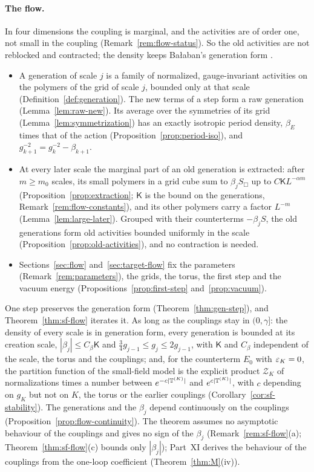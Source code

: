 \paragraph{The flow.} In four dimensions the coupling is marginal, and the activities are of order one, not small in the coupling (Remark~\ref{rem:flow-status}). So the old activities are not reblocked and contracted; the density keeps Ba\l aban's generation form \cite[(0.22)--(0.30)]{BalYM4I}.
\begin{itemize}
\item A generation of scale $j$ is a family of normalized, gauge-invariant activities on the polymers of the grid of scale $j$, bounded only at that scale (Definition~\ref{def:generation}). The new terms of a step form a raw generation (Lemma~\ref{lem:raw-new}). Its average over the symmetries of its grid (Lemma~\ref{lem:symmetrization}) has an exactly isotropic period density, $\beta_E$ times that of the action (Proposition~\ref{prop:period-iso}), and $g_{k+1}^{-2}=g_k^{-2}-\beta_{k+1}$.
\item At every later scale the marginal part of an old generation is extracted: after $m\ge m_0$ scales, its small polymers in a grid cube sum to $\beta_jS_\Box$ up to $C\mathsf KL^{-\alpha m}$ (Proposition~\ref{prop:extraction}; $\mathsf K$ is the bound on the generations, Remark~\ref{rem:flow-constants}), and its other polymers carry a factor $L^{-m}$ (Lemma~\ref{lem:large-later}). Grouped with their counterterms $-\beta_jS$, the old generations form old activities bounded uniformly in the scale (Proposition~\ref{prop:old-activities}), and no contraction is needed.
\item Sections~\ref{sec:flow} and~\ref{sec:target-flow} fix the parameters (Remark~\ref{rem:parameters}), the grids, the torus, the first step and the vacuum energy (Propositions~\ref{prop:first-step} and~\ref{prop:vacuum}).
\end{itemize}
One step preserves the generation form (Theorem~\ref{thm:gen-step}), and Theorem~\ref{thm:sf-flow} iterates it. As long as the couplings stay in $(0,\gamma]$: the density of every scale is in generation form, every generation is bounded at its creation scale, $|\beta_j|\le C_\beta\mathsf K$ and $\frac34g_{j-1}\le g_j\le2g_{j-1}$, with $\mathsf K$ and $C_\beta$ independent of the scale, the torus and the couplings; and, for the counterterm $E_0$ with $\varepsilon_K=0$, the partition function of the small-field model is the explicit product $\mathcal Z_K$ of normalizations times a number between $e^{-c|\mathbb T^{(K)}|}$ and $e^{c|\mathbb T^{(K)}|}$, with $c$ depending on $g_K$ but not on $K$, the torus or the earlier couplings (Corollary~\ref{cor:sf-stability}). The generations and the $\beta_j$ depend continuously on the couplings (Proposition~\ref{prop:flow-continuity}). The theorem assumes no asymptotic behaviour of the couplings and gives no sign of the $\beta_j$ (Remark~\ref{rem:sf-flow}(a); Theorem~\ref{thm:sf-flow}(c) bounds only $|\beta_j|$); Part~XI derives the behaviour of the couplings from the one-loop coefficient (Theorem~\ref{thm:M}(iv)).

